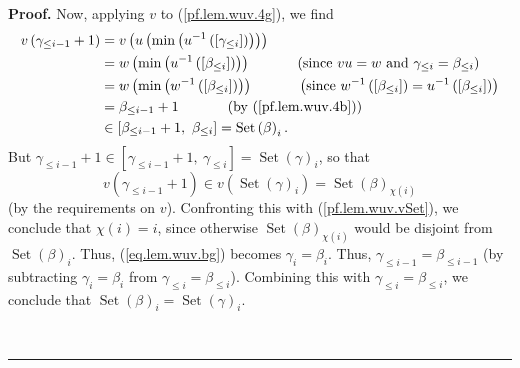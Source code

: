 \documentclass[submission]{FPSAC2026}
\newenvironment{proof}[1][Proof]{\noindent\textbf{#1.} }{\ \rule{0.5em}{0.5em}}
\begin{document}
\begin{proof}
Now, applying $v$ to (\ref{pf.lem.wuv.4g}), we find
\begin{align}
v\left(  \gamma_{\leq i-1}+1\right)    & =v\left(  u\left(  \min\left(
u^{-1}\left(  \left[  \gamma_{\leq i}\right]  \right)  \right)  \right)
\right)  \nonumber\\
& =w\left(  \min\left(  u^{-1}\left(  \left[  \beta_{\leq i}\right]  \right)
\right)  \right)  \ \ \ \ \ \ \ \ \ \ \left(  \text{since }vu=w
\text{ and } \gamma_{\leq i} = \beta_{\leq i} \right)
\nonumber\\
& =w\left(  \min\left(  w^{-1}\left(  \left[  \beta_{\leq i}\right]  \right)
\right)  \right)  \ \ \ \ \ \ \ \ \ \ \left(  \text{since }w^{-1}\left(
\left[  \beta_{\leq i}\right]  \right)  =u^{-1}\left(  \left[  \beta_{\leq
i}\right]  \right)  \right)  \nonumber\\
& =\beta_{\leq i-1}+1\ \ \ \ \ \ \ \ \ \ \left(  \text{by (\ref{pf.lem.wuv.4b}%
)}\right)  \label{pf.lem.wuv.v1}\\
& \in\left[  \beta_{\leq i-1}+1,\ \beta_{\leq i}\right]  =\operatorname*{Set}%
\left(  \beta\right)  _{i}.\label{pf.lem.wuv.vSet}%
\end{align}
But $\gamma_{\leq i-1}+1\in\left[  \gamma_{\leq i-1}+1,\ \gamma_{\leq
i}\right]  =\operatorname*{Set}\left(  \gamma\right)  _{i}$, so that%
\[
v\left(  \gamma_{\leq i-1}+1\right)  \in v\left(  \operatorname*{Set}\left(
\gamma\right)  _{i}\right)  =\operatorname*{Set}\left(  \beta\right)
_{\chi\left(  i\right)  }%
\]
(by the requirements on $v$). Confronting this with (\ref{pf.lem.wuv.vSet}),
we conclude that $\chi\left(  i\right)  =i$, since otherwise
$\operatorname*{Set}\left(  \beta\right)  _{\chi\left(  i\right)  }$ would be
disjoint from $\operatorname*{Set}\left(  \beta\right)  _{i}$. Thus,
(\ref{eq.lem.wuv.bg}) becomes $\gamma_{i}=\beta_{i}$. Thus, $\gamma_{\leq
i-1}=\beta_{\leq i-1}$ (by subtracting $\gamma_{i}=\beta_{i}$ from
$\gamma_{\leq i}=\beta_{\leq i}$). Combining this with $\gamma_{\leq i}%
=\beta_{\leq i}$, we conclude that $\operatorname*{Set}\left(  \beta\right)
_{i}=\operatorname*{Set}\left(  \gamma\right)  _{i}$.


\end{proof}
\end{document}
